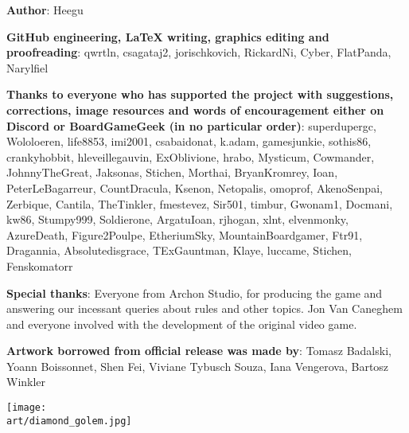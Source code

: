 
\bigbreak

\begin{multicols*}{2}

\textbf{Author}: Heegu\par
\textbf{GitHub engineering, LaTeX writing, graphics editing and proofreading}: qwrtln, csagataj2, jorischkovich, RickardNi, Cyber, FlatPanda, Narylfiel\par
\textbf{Thanks to everyone who has supported the project with suggestions, corrections, image resources and words of encouragement either on Discord or BoardGameGeek (in no particular order)}: superdupergc, Wololoeren, life8853, imi2001, csabaidonat, k.adam, gamesjunkie, sothis86, cranky\textunderscore hobbit, hleveillegauvin, ExOblivione, hrabo, Mysticum, Cowmander, JohnnyTheGreat, Jaksonas, Stichen, Morthai, BryanKromrey, Ioan, PeterLeBagarreur, \textunderscore Count\textunderscore Dracula\textunderscore , \space Ksenon, Netopalis, omoprof, AkenoSenpai, Zerbique, Cantila, TheTinkler, fmestevez, Sir501, timbur, Gwonam1, Docmani, kw86, Stumpy999, Soldierone, Argatu\textunderscore Ioan, rj\textunderscore hogan, xlnt, elvenmonky, AzureDeath, Figure2Poulpe, EtheriumSky, MountainBoardgamer, Ftr91, Dragannia, Absolutedisgrace, TExGauntman, Klaye, luccame, Stichen, Fenskomatorr
\par

\textbf{Special thanks}: Everyone from Archon Studio, for producing the game and answering our incessant queries about rules and other topics.
Jon Van Caneghem and everyone involved with the development of the original video game.\par
\textbf{Artwork borrowed from official release was made by}: Tomasz Badalski, Yoann Boissonnet, Shen Fei, Viviane Tybusch Souza, Iana Vengerova, Bartosz Winkler

\columnbreak

\texttt{[image: \\art/diamond\_golem.jpg]}

\end{multicols*}
